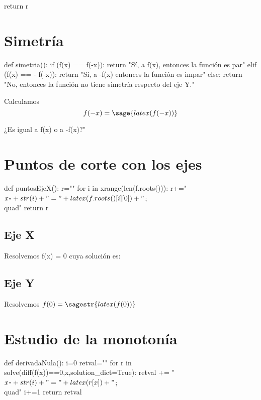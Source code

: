 \documentclass[nochap,palatino]{apuntes}
\begin{document}
\begin{problem}
\begin{sagesilent}
    return r

\end{sagesilent}


\section{Simetría}
\begin{sagesilent}
def simetria():
    if (f(x) == f(-x)):
        return "Sí, a f(x), entonces la función es par"
    elif (f(x) == - f(-x)):
        return "Sí, a -f(x) entonces la función es impar"
    else:
        return "No, entonces la función no tiene simetría respecto del eje Y."
\end{sagesilent}

Calculamos 
\[f(-x) = \sage{latex(f(-x))}\]

¿Es igual a f(x) o a -f(x)?" 

\section{Puntos de corte con los ejes}
\begin{sagesilent}
def puntosEjeX():
    r=""
    for i in xrange(len(f.roots())):
        r+="$x_"+str(i)+" = "+latex(f.roots()[i][0])+"$;\\quad"
    return r
\end{sagesilent}

\subsection{Eje X}
Resolvemos f(x) = 0 cuya solución es: 

\subsection{Eje Y}
Resolvemos $f(0)=\sagestr{latex(f(0))}$


\section{Estudio de la monotonía}

\begin{sagesilent}
def derivadaNula():
    i=0
    retval=""
    for r in solve(diff(f(x))==0,x,solution_dict=True):
        retval += "$x_"+str(i)+" = "+latex(r[x])+"$;\\quad"
        i+=1
    return retval


\end{sagesilent}
\end{problem}
\end{document}
